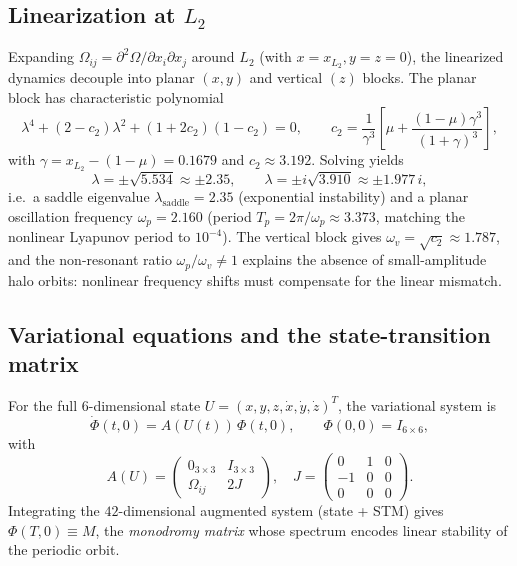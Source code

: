 \documentclass[11pt,a4paper]{article}
\begin{document}
\subsection{Linearization at $L_2$}
Expanding $\Omega_{ij} = \partial^2 \Omega /\partial x_i \partial x_j$ around $L_2$ (with $x = x_{L_2}, y = z = 0$), the linearized dynamics decouple into planar $(x,y)$ and vertical $(z)$ blocks. The planar block has characteristic polynomial
\begin{equation}
\lambda^4 + (2 - c_2)\lambda^2 + (1+2c_2)(1-c_2) = 0, \qquad
c_2 = \frac{1}{\gamma^3}\!\left[\mu + \frac{(1-\mu)\gamma^3}{(1+\gamma)^3}\right],
\end{equation}
with $\gamma = x_{L_2} - (1-\mu) = 0.1679$ and $c_2 \approx 3.192$. Solving yields
\begin{equation}
\lambda = \pm \sqrt{5.534} \approx \pm 2.35, \qquad
\lambda = \pm i \sqrt{3.910} \approx \pm 1.977\,i,
\end{equation}
i.e.\ a saddle eigenvalue $\lambda_{\text{saddle}} = 2.35$ (exponential instability) and a planar oscillation frequency $\omega_p = 2.160$ (period $T_p = 2\pi/\omega_p \approx 3.373$, matching the nonlinear Lyapunov period to $10^{-4}$). The vertical block gives $\omega_v = \sqrt{c_2} \approx 1.787$, and the non-resonant ratio $\omega_p/\omega_v \neq 1$ explains the absence of small-amplitude halo orbits: nonlinear frequency shifts must compensate for the linear mismatch.

\subsection{Variational equations and the state-transition matrix}
For the full 6-dimensional state $U = (x,y,z,\dot x, \dot y, \dot z)^T$, the variational system is
\begin{equation}
\dot \Phi(t,0) = A(U(t))\,\Phi(t,0), \qquad \Phi(0,0) = I_{6\times 6},
\end{equation}
with
\begin{equation}
A(U) =
\begin{pmatrix}
0_{3\times 3} & I_{3\times 3} \\
\Omega_{ij} & 2J
\end{pmatrix},
\quad J = \begin{pmatrix} 0 & 1 & 0 \\ -1 & 0 & 0 \\ 0 & 0 & 0 \end{pmatrix}.
\end{equation}
Integrating the $42$-dimensional augmented system (state + STM) gives $\Phi(T,0) \equiv M$, the \emph{monodromy matrix} whose spectrum encodes linear stability of the periodic orbit.
\end{document}
